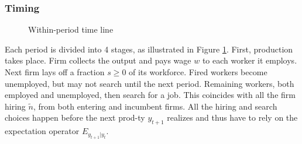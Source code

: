 \subsubsection*{Timing}
    \begin{figure}
        \centering
{}
\caption{Within-period time line} \label{fig:Timing}
\end{figure}

Each period is divided into 4 stages, as illustrated in Figure \ref{fig:Timing}. First, production takes place. Firm collects the output and pays wage $w$ to each worker it employs. Next firm lays off a fraction $s\geq 0$ of its workforce. Fired workers become unemployed, but may not search until the next period. Remaining workers, both employed and unemployed, then search for a job. This coincides with all the firm hiring $\tilde{n}$, from both entering and incumbent firms. All the hiring and search choices happen before the next prod-ty $y_{t+1}$ realizes and thus have to rely on the expectation operator $E_{y_{t+1}|y_t}$.
